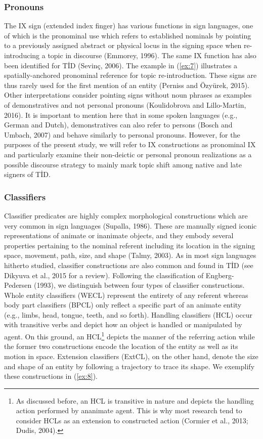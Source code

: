 \documentclass[]{elsarticle} %
\begin{document}
\hypertarget{pronouns}{%
\subsubsection{Pronouns}\label{pronouns}}

The IX sign (extended index finger) has various functions in sign
languages, one of which is the pronominal use which refers to
established nominals by pointing to a previously assigned abstract or
physical locus in the signing space when re-introducing a topic in
discourse (Emmorey, 1996). The same IX function has also been identified
for TİD (Sevinç, 2006). The example in (\ref{ex:7}) illustrates a
spatially-anchored pronominal reference for topic re-introduction. These
signs are thus rarely used for the first mention of an entity (Perniss
and Özyürek, 2015). Other interpretations consider pointing signs
without noun phrases as examples of demonstratives and not personal
pronouns (Koulidobrova and Lillo-Martin, 2016). It is important to
mention here that in some spoken languages (e.g., German and Dutch),
demonstratives can also refer to persons (Bosch and Umbach, 2007) and
behave similarly to personal pronouns. However, for the purposes of the
present study, we will refer to IX constructions as pronominal IX and
particularly examine their non-deictic or personal pronoun realizations
as a possible discourse strategy to mainly mark topic shift among native
and late signers of TİD.

\hypertarget{classifiers}{%
\subsubsection{Classifiers}\label{classifiers}}

Classifier predicates are highly complex morphological constructions
which are very common in sign languages (Supalla, 1986). These are
manually signed iconic representations of animate or inanimate objects,
and they embody several properties pertaining to the nominal referent
including its location in the signing space, movement, path, size, and
shape (Talmy, 2003). As in most sign languages hitherto studied,
classifier constructions are also common and found in TİD (see Dikyuva
et al., 2015 for a review). Following the classification of
Engberg-Pedersen (1993), we distinguish between four types of classifier
constructions. Whole entity classifiers (WECL) represent the entirety of
any referent whereas body part classifiers (BPCL) only reflect a
specific part of an animate entity (e.g., limbs, head, tongue, teeth,
and so forth). Handling classifiers (HCL) occur with transitive verbs
and depict how an object is handled or manipulated by agent. On this
ground, an HCL\footnote{As discussed before, an HCL is transitive in
  nature and depicts the handling action performed by ananimate agent.
  This is why most research tend to consider HCLs as an extension to
  constructed action (Cormier et al., 2013; Dudis, 2004).} depicts the
manner of the referring action while the former two constructions encode
the location of the entity as well as its motion in space. Extension
classifiers (ExtCL), on the other hand, denote the size and shape of an
entity by following a trajectory to trace its shape. We exemplify these
constructions in (\ref{ex:8}).
\end{document}
